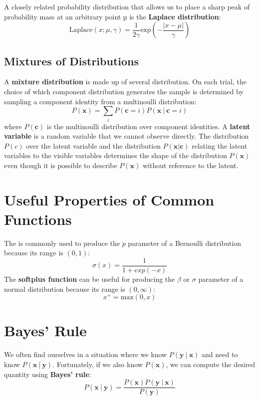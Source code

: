 \documentclass[12pt]{report}
\begin{document}
            A closely related probability distribution that allows us to place a sharp peak of probability mass at an arbitrary point µ is the \textbf{Laplace distribution}:
            \begin{equation}
                \text{Laplace}(x;\mu,\gamma) = \frac{1}{2\gamma}\text{exp}\left(-\frac{|x - \mu|}{\gamma}\right)
            \end{equation}
        \subsection{Mixtures of Distributions}
            A \textbf{mixture distribution} is made up of several distribution. On each trial, the choice of which component distribution generates the sample is determined by sampling a component identity from a multinoulli distribution:
            \begin{equation}
                P(\mathbf{x}) = \sum_i{P(\mathbf{c} = i)}P(\mathbf{x}~|~\mathbf{c}=i)
            \end{equation}
            where $P(\mathbf{c})$ is the multinoulli distribution over component identities.
            A \textbf{latent variable} is a random variable that we cannot observe directly. The distribution $P(c)$ over the latent variable and the distribution $P(\mathbf{x} | \mathbf{c})$ relating the latent variables to the visible variables determines the shape of the distribution $P(\mathbf{x})$ even though it is possible to describe $P(\mathbf{x})$ without reference to the latent.
    \section{Useful Properties of Common Functions}
        The  is commonly used to produce the $p$ parameter of a Bernoulli distribution because its range is $(0,1)$:
        \begin{equation}
            \sigma(x) = \frac{1}{1 + exp(-x)}
        \end{equation}
        The \textbf{softplus function} can be useful for producing the $\beta$ or $\sigma$ parameter of a normal distribution because its range is $(0,\infty)$:
        \begin{equation}
            x^+ = \text{max}(0, x)
        \end{equation}
    \section{Bayes' Rule}
        We often find ourselves in a situation where we know $P(\mathbf{y}~|~\mathbf{x})$ and need to know $P(\mathbf{x}~|~\mathbf{y})$. Fortunately, if we also know $P(\mathbf{x})$, we can compute the desired quantity using \textbf{Bayes’ rule}:
        \begin{equation}
            P(\mathbf{x}~|~\mathbf{y}) = \frac{P(\mathbf{x})P(\mathbf{y}~|~\mathbf{x})}{P(\mathbf{y})}
        \end{equation}
\end{document}
